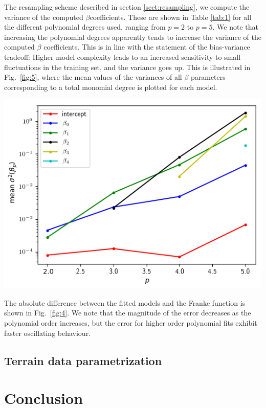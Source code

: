 \documentclass[a4paper]{article}
\newcommand{\fig}[1]{Fig.\ \ref{fig:#1}}
\newcommand{\tab}[1]{Table \ref{tab:#1}}
\newenvironment{Figure}
  {\par\medskip\noindent\minipage{\linewidth}}
  {\endminipage\par\medskip}
\begin{document}
\begin{multicols}{2}
The resampling scheme described in section \ref{sect:resampling}, we compute the variance of the computed $\beta$coefficients. These are shown in \tab{1} for all the different polynomial degrees used, ranging from $p=2$ to $p=5$. We note that increasing the polynomial degrees apparently tends to increase the variance of the computed $\beta$ coefficients. This is in line with the statement of the bias-variance tradeoff: Higher model complexity leads to an increased sensitivity to small fluctuations in the training set, and the variance goes up. This is illustrated in \fig{5}, where the mean values of the variances of all $\beta$ parameters corresponding to a total monomial degree is plotted for each model. 

\begin{Figure}
\centering
\includegraphics[width=\linewidth]{beta_variance_OLS.png}
\end{Figure}

The absolute difference between the fitted models and the Franke function is shown in \fig{4}. We note that the magnitude of the error decreases as the polynomial order increases, but the error for higher order polynomial fits exhibit faster oscillating behaviour. 



\subsection{Terrain data parametrization}
\lipsum[3]

\section{Conclusion}
\lipsum[3]
\end{multicols}


\printbibliography[heading=bibintoc]
\end{document}
